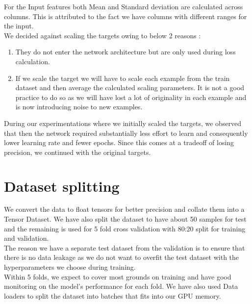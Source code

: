 \documentclass{report} %
\begin{document}
\vspace{0.2cm} %

For the Input features both Mean and Standard deviation are calculated across columns. This is attributed to the fact we have columns with different ranges for the input.\\ 

We decided against scaling the targets owing to below 2 reasons :
\begin{enumerate}
    \item They do not enter the network architecture but are only used during loss calculation.
    \item If we scale the target we will have to scale each example from the train dataset and then average the calculated scaling parameters.
    It is not a good practice to do so as we will have lost a lot of originality in each example and is now introducing noise to new examples.\\
\end{enumerate}

During our experimentations where we initially scaled the targets, we observed that then the network required substantially less effort to learn and consequently lower learning rate and fewer epochs.
Since this comes at a tradeoff of losing precision, we continued with the original targets.\\

\section{Dataset splitting}\label{sec:Dataset splitting}

We convert the data to float tensors for better precision and collate them into a Tensor Dataset.
We have also split the dataset to have about 50 samples for test and the remaining is used for 5 fold cross validation with 80:20 split for training and validation. \\
The reason we have a separate test dataset from the validation is to ensure that there is no data leakage as we do not want to overfit the test dataset with the hyperparameters we choose during training. \\

Within 5 folds, we expect to cover most grounds on training and have good monitoring on the model's performance for each fold.
We have also used Data loaders to split the dataset into batches that fits into our \ac{GPU} memory.
\end{document}
